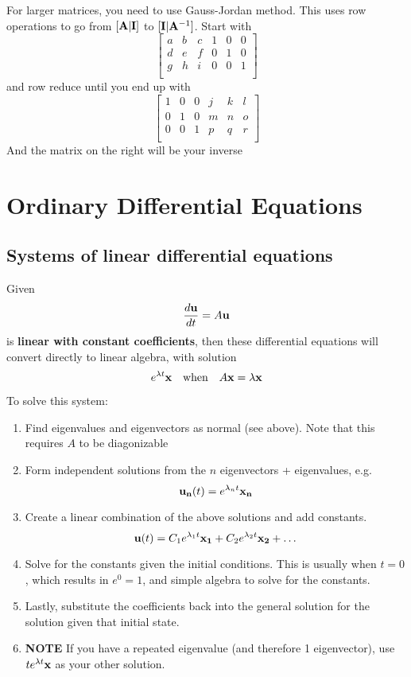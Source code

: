 \documentclass{article}
\begin{document}
For larger matrices, you need to use Gauss-Jordan method.  This uses row operations to go from $[\vb{A} | \vb{I}]$ to $[\vb{I} | \vb{A}^{-1}]$. Start with
$$
\begin{bmatrix}
	a & b & c & 1 & 0 & 0 \\
	d & e & f & 0 & 1 & 0 \\
	g & h & i & 0 & 0 & 1 \\
\end{bmatrix}
$$
and row reduce until you end up with 
$$
\begin{bmatrix}
	1 & 0 & 0 & j & k & l \\
	0 & 1 & 0 & m & n & o \\
	0 & 0 & 1 & p & q & r \\
\end{bmatrix}
$$
And the matrix on the right will be your inverse
\section{Ordinary Differential Equations}
\subsection{Systems of linear differential equations}
Given 
$$
\frac{d\vb{u}}{dt} = A \vb{u}
$$
is \textbf{linear with constant coefficients}, then these differential equations will convert directly to linear algebra, with solution 
$$
e^{\lambda t} \vb{x} \quad \text{when} \quad A\vb{x} = \lambda \vb{x}
$$

To solve this system:
\begin{enumerate}
	\item Find eigenvalues and eigenvectors as normal (see above).  Note that this requires $A$ to be diagonizable
	\item Form independent solutions from the $n$ eigenvectors + eigenvalues, e.g.
	      $$
	      \vb{u_n}(t) = e^{\lambda_n t}\vb{x_n}
	      $$
	\item Create a linear combination of the above solutions and add constants.
	      $$
	      \vb{u}(t) = C_1 e^{\lambda_1 t}\vb{x_1} + C_2 e^{\lambda_2 t}\vb{x_2} + \dots
	      $$
	\item Solve for the constants given the initial conditions.  This is usually when $t = 0$, which results in $e^{0} = 1$, and simple algebra to solve for the constants.
	\item Lastly, substitute the coefficients back into the general solution for the solution given that initial state.
	\item \textbf{NOTE} If you have a repeated eigenvalue (and therefore 1 eigenvector), use $te^{\lambda t} \vb{x}$ as your other solution.
\end{enumerate}
\end{document}
